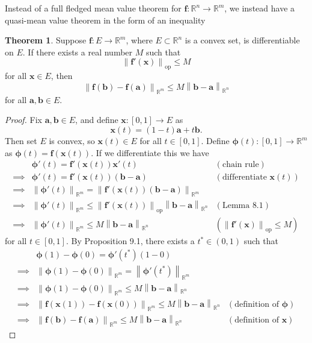 \documentclass{article}
\newcommand{\R}{\mathbb{R}}
\newcommand{\x}{\mathbf{x}}
\newcommand{\f}{\mathbf{f}}
\renewcommand{\b}{\mathbf{b}}
\renewcommand{\a}{\mathbf{a}}
\newcommand{\norm}[1]{\left\lVert#1\right\rVert}
\newcommand{\normop}[1]{\left\lVert#1\right\rVert_\text{op}}
\theoremstyle{definition}
\newtheorem{theorem}{Theorem}[section]
\begin{document}
	Instead of a full fledged mean value theorem for $ \f:\R^n\to\R^m $, we instead have a quasi-mean value theorem in the form of an inequality
	\begin{theorem}
		Suppose $ \f:E\to\R^m $, where $ E\subset \R^n $ is a convex set, is differentiable on $ E $. If there exists a real number $ M $ such that $$ \normop{\f'(\x)}\le M$$ for all $ \x\in E $, then $$ \norm{\f(\b)-\f(\a)}_{\R^m} \le M\norm{\b-\a}_{\R^n}$$ for all $ \a,\b\in E $. 
	\end{theorem}
	\begin{proof}
		Fix $ \a,\b\in E $, and define $ \x:[0,1]\to E $ as $$ \x(t)= (1-t)\a + t\b . $$ Then set $ E $ is convex, so $ \x(t)\in E $ for all $ t\in[0,1] $. Define $ \boldsymbol{\phi}(t):[0,1]\to \R^m $ as $\boldsymbol{\phi}(t)=\f(\x(t)) $. If we differentiate this we have 
		\begin{align*}
			&	\boldsymbol{\phi}'(t) = \f'(\x(t))\x'(t) & (\text{chain rule})\\
			\implies & 	\boldsymbol{\phi}'(t) = \f'(\x(t))(\b-\a) & (\text{differentiate }\x(t))\\
			\implies & \norm{\boldsymbol{\phi}'(t)}_{\R^m} = \norm{\f'(\x(t))(\b-\a) }_{\R^m}\\ 
			\implies &\norm{\boldsymbol{\phi}'(t)}_{\R^m} \le \normop{\f'(\x(t))}\norm{\b-\a }_{\R^n} & (\text{Lemma }8.1)\\ \implies &\norm{\boldsymbol{\phi}'(t)}_{\R^m} \le M\norm{\b-\a }_{\R^n} & \left(\normop{\f'(\x)}\le M\right)
		\end{align*}
		for all $ t\in[0,1] $. By Proposition 9.1, there exists a $ t^*\in (0,1) $ such that 
		\begin{align*}
			&\boldsymbol{\phi}(1)-\boldsymbol{\phi}(0)= \boldsymbol{\phi}'(t^*)(1 - 0) \\ \implies& \norm{\boldsymbol{\phi}(1)-\boldsymbol{\phi}(0)}_{\R^m}= \norm{\boldsymbol{\phi}'(t^*)}_{\R^m}\\
			\implies& \norm{\boldsymbol{\phi}(1)-\boldsymbol{\phi}(0)}_{\R^m}\le  M\norm{\b-\a}_{\R^n}\\
			\implies& \norm{\f(\x(1)) - \f(\x(0)) }_{\R^m} \le  M\norm{\b-\a}_{\R^n}&(\text{definition of }\boldsymbol\phi) \\
			\implies & \norm{\f(\b) - \f(\a) }_{\R^m} \le  M\norm{\b-\a}_{\R^n}&(\text{definition of }\x)
		\end{align*}
	\end{proof}
\end{document}
